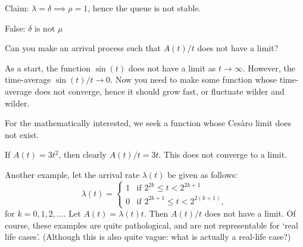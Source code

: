 \documentclass[stochastic-or.tex]{subfiles}
\begin{document}
\begin{truefalse}
    Claim: $\lambda = \delta \implies \rho = 1$, hence the queue is not stable.
\begin{solution}
        False: $\delta$ is not $\mu$
\end{solution}
\end{truefalse}

\begin{extra}
  Can you make an arrival process such that $A(t)/t$ does not have a limit?
\begin{hint}
  As a start, the function $\sin(t)$ does not have a limit as $t\to\infty$.
  However, the time-average $\sin(t)/t \to 0$.
  Now you need to make some function whose time-average does not converge, hence it should grow fast, or fluctuate wilder and wilder.

 For the mathematically interested, we seek a function whose Ces\`aro limit does not exist.
\end{hint}
\begin{solution}
 If $A(t) = 3 t^2$, then clearly $A(t)/t = 3t$. This does not
 converge to a limit.

 Another example, let the arrival rate $\lambda(t)$ be given as follows:
 \begin{equation*}
 \lambda(t) =
 \begin{cases}
 1 & \text{if } 2^{2k} \leq t < 2^{2k+1} \\
 0 & \text{if } 2^{2k+1} \leq t < 2^{2(k+1)},
 \end{cases}
 \end{equation*}
 for $k=0,1,2,\ldots$.
 Let $A(t) = \lambda(t) t$.
 Then $A(t)/t$ does not have a limit.
 Of course, these examples are quite pathological, and are not representable for `real life cases'.
 (Although this is also quite vague:  what is actually a real-life case?)
\end{solution}
\end{extra}


\end{document}
